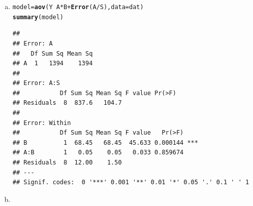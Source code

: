 \documentclass{article}\usepackage[]{graphicx}\usepackage[]{color}
\makeatletter
\newcommand{\hlopt}[1]{\textcolor[rgb]{0,0,0}{#1}}%
\newcommand{\hlstd}[1]{\textcolor[rgb]{0.345,0.345,0.345}{#1}}%
\newcommand{\hlkwb}[1]{\textcolor[rgb]{0.69,0.353,0.396}{#1}}%
\newcommand{\hlkwc}[1]{\textcolor[rgb]{0.333,0.667,0.333}{#1}}%
\newcommand{\hlkwd}[1]{\textcolor[rgb]{0.737,0.353,0.396}{\textbf{#1}}}%
\newenvironment{kframe}{%
 \def\at@end@of@kframe{}%
 \ifinner\ifhmode%
  \def\at@end@of@kframe{\end{minipage}}%
  \begin{minipage}{\columnwidth}%
 \fi\fi%
 \def\FrameCommand##1{\hskip\@totalleftmargin \hskip-\fboxsep
 \colorbox{shadecolor}{##1}\hskip-\fboxsep
     \hskip-\linewidth \hskip-\@totalleftmargin \hskip\columnwidth}%
 \MakeFramed {\advance\hsize-\width
   \@totalleftmargin\z@ \linewidth\hsize
   \@setminipage}}%
 {\par\unskip\endMakeFramed%
 \at@end@of@kframe}
\newenvironment{knitrout}{}{} %
\makeatother
\begin{document}
\begin{enumerate}[(a)]

\item

\begin{knitrout}
\color{fgcolor}\begin{kframe}
\begin{alltt}
  \hlstd{model} \hlkwb{=} \hlkwd{aov}\hlstd{(Y}\hlopt{~} \hlstd{A}\hlopt{*}\hlstd{B}\hlopt{+}\hlkwd{Error}\hlstd{(A}\hlopt{/}\hlstd{S),} \hlkwc{data} \hlstd{= dat)}
  \hlkwd{summary}\hlstd{(model)}
\end{alltt}
\begin{verbatim}
## 
## Error: A
##   Df Sum Sq Mean Sq
## A  1   1394    1394
## 
## Error: A:S
##           Df Sum Sq Mean Sq F value Pr(>F)
## Residuals  8  837.6   104.7               
## 
## Error: Within
##           Df Sum Sq Mean Sq F value   Pr(>F)    
## B          1  68.45   68.45  45.633 0.000144 ***
## A:B        1   0.05    0.05   0.033 0.859674    
## Residuals  8  12.00    1.50                     
## ---
## Signif. codes:  0 '***' 0.001 '**' 0.01 '*' 0.05 '.' 0.1 ' ' 1
\end{verbatim}
\end{kframe}
\end{knitrout}

\item


\end{enumerate}
\end{document}
